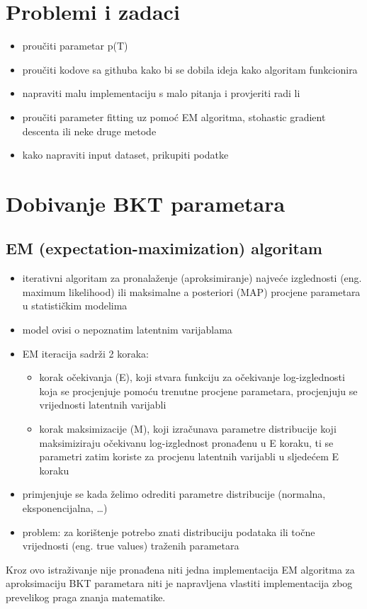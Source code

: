 \documentclass[times, utf8,projekt]{fer}
\begin{document}
\section{Problemi i zadaci}
\begin{itemize}
	\item proučiti parametar p(T)
	\item proučiti kodove sa githuba kako bi se dobila ideja kako algoritam funkcionira
	\item napraviti malu implementaciju s malo pitanja i provjeriti radi li
	\item proučiti parameter fitting uz pomoć EM algoritma, stohastic gradient descenta ili neke druge metode
	\item kako napraviti input dataset, prikupiti podatke
	
	
\end{itemize}
\section{Dobivanje BKT parametara}
\subsection{EM (expectation-maximization) algoritam}

\begin{itemize}
	\item iterativni algoritam za pronalaženje (aproksimiranje) najveće izglednosti (eng. maximum likelihood) ili maksimalne a posteriori (MAP) procjene parametara u statističkim modelima
	\item model ovisi o nepoznatim latentnim varijablama
	\item EM iteracija sadrži 2 koraka:
	\begin{itemize}
		\item 	korak očekivanja (E), koji stvara funkciju za očekivanje log-izglednosti koja se procjenjuje pomoću trenutne procjene parametara, procjenjuju se vrijednosti latentnih varijabli
		\item 	korak maksimizacije (M), koji izračunava parametre distribucije koji maksimiziraju očekivanu log-izglednost pronađenu u E koraku, ti se parametri zatim koriste za procjenu latentnih varijabli u sljedećem E koraku
	\end{itemize}
	
	\item primjenjuje se kada želimo odrediti parametre distribucije (normalna, eksponencijalna, …)
	\item problem: za korištenje potrebo znati distribuciju podataka ili točne vrijednosti (eng. true values) traženih parametara
	
\end{itemize}
Kroz ovo istraživanje nije pronađena niti jedna implementacija EM algoritma za aproksimaciju BKT parametara niti je napravljena vlastiti implementacija zbog prevelikog praga znanja matematike.
\end{document}
